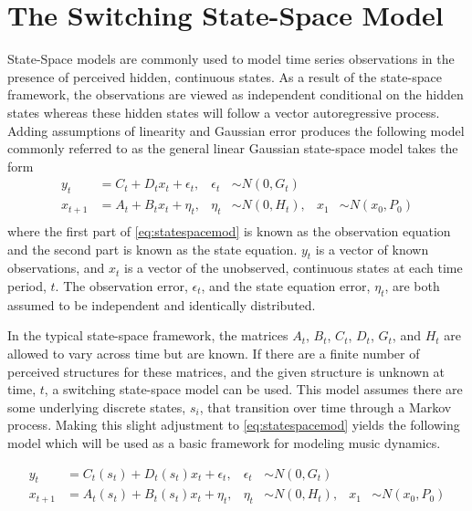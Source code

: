 \documentclass[12pt]{article}
\begin{document}
\section{The Switching State-Space Model}
\label{sec:model}

State-Space models are commonly used to model time series observations
in the presence of perceived hidden, continuous states. As a result of
the state-space framework, the observations are viewed as independent
conditional on the hidden states whereas these hidden states will follow
a vector autoregressive process. Adding assumptions of linearity and
Gaussian error produces the following model commonly referred to as the
general linear Gaussian state-space model \citet{durbin_time_2012} takes
the form \begin{equation}
  \begin{aligned}
    y_t &= C_t + D_tx_t + \epsilon_t, 
    & \epsilon_t & \sim N(0,G_t)\\
    x_{t+1} &= A_t + B_tx_t + \eta_t, 
    & \eta_t & \sim N(0,H_t), 
    & x_1 & \sim N(x_0,P_0) \\
  \end{aligned}
  \label{eq:statespacemod}
\end{equation} where the first part of \autoref{eq:statespacemod} is
known as the observation equation and the second part is known as the
state equation. \(y_t\) is a vector of known observations, and \(x_t\)
is a vector of the unobserved, continuous states at each time period,
\(t\). The observation error, \(\epsilon_t\), and the state equation
error, \(\eta_t\), are both assumed to be independent and identically
distributed.

In the typical state-space framework, the matrices \(A_t\), \(B_t\),
\(C_t\), \(D_t\), \(G_t\), and \(H_t\) are allowed to vary across time
but are known. If there are a finite number of perceived structures for
these matrices, and the given structure is unknown at time, \(t\), a
switching state-space model can be used. This model assumes there are
some underlying discrete states, \(s_i\), that transition over time
through a Markov process. Making this slight adjustment to
\autoref{eq:statespacemod} yields the following model which will be used
as a basic framework for modeling music dynamics.

\begin{equation}
  \begin{aligned}
    y_t &= C_t(s_t) + D_t(s_t)x_t + \epsilon_t, 
    & \epsilon_t & \sim N(0,G_t)\\
    x_{t+1} &= A_t(s_t) + B_t(s_t)x_t + \eta_t, 
    & \eta_t & \sim N(0,H_t), 
    & x_1 & \sim N(x_0,P_0) \\
  \end{aligned}
  \label{eq:switchstatemodel}
\end{equation}
\end{document}
